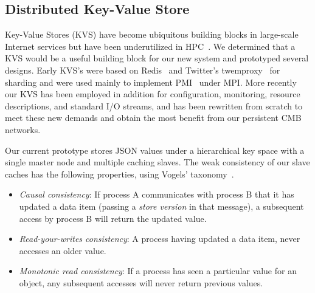 \subsection{Distributed Key-Value Store}

Key-Value Stores (KVS) have become ubiquitous building blocks in large-scale
Internet services but have been underutilized in HPC~\cite{Wang:2013:USE:2503210.2503239}.
We determined that a KVS would be a
useful building block for our new system and prototyped several designs.
Early \flux KVS's were based on Redis~\cite{Redis} and Twitter's
twemproxy~\cite{Twemproxy} for sharding and were used mainly to implement
PMI~\cite{PMI2} under MPI.  More recently our KVS has been employed 
in addition for configuration, monitoring, resource descriptions, and
standard I/O streams, and has been rewritten from scratch to meet these
new demands and obtain the most benefit from our persistent CMB networks.

Our current prototype stores JSON values under a hierarchical key space
with a single master node and multiple caching slaves.  The weak consistency
of our slave caches has the following properties, using Vogels'
taxonomy~\cite{Vogels:2009:EC:1435417.1435432}.

\begin{itemize}
\item{{\em Causal consistency}:  If process A communicates with process B
that it has updated a data item (passing a {\em store version} in that
message), a subsequent access by process B will return the updated value.}
\item{{\em Read-your-writes consistency}:  A process having updated a
data item, never accesses an older value.}
\item{{\em Monotonic read consistency}:  If a process has seen a particular
value for an object, any subsequent accesses will never return previous values.}
\end{itemize}

